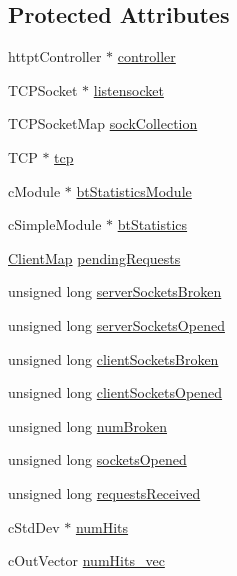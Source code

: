 \subsection*{Protected Attributes}
\begin{DoxyCompactItemize}
\item 
httpt\+Controller $\ast$ \hyperlink{classBTCache_ac46f1f65119dfee3d87c5363101aa58b}{controller}
\item 
T\+C\+P\+Socket $\ast$ \hyperlink{classBTCache_ae3203717845093fb0a6e779f9d3d0b52}{listensocket}
\item 
T\+C\+P\+Socket\+Map \hyperlink{classBTCache_a43a311974146b2ef6bc69f6859d24e8e}{sock\+Collection}
\item 
T\+C\+P $\ast$ \hyperlink{classBTCache_ae867f4ad74074c00b641e390d3a9e372}{tcp}
\item 
c\+Module $\ast$ \hyperlink{classBTCache_a404b5d16a842340af5de6fab08181da9}{bt\+Statistics\+Module}
\item 
c\+Simple\+Module $\ast$ \hyperlink{classBTCache_a8299e74f2c743652ed3301c011656928}{bt\+Statistics}
\item 
\hyperlink{classBTCache_ac80b2a8f5787af11c89dbd05a187029e}{Client\+Map} \hyperlink{classBTCache_a27d62db096c4d09c449ecb10d8d19abf}{pending\+Requests}
\item 
unsigned long \hyperlink{classBTCache_a8f2f146c44949bcf78646c043caaae40}{server\+Sockets\+Broken}
\item 
unsigned long \hyperlink{classBTCache_a2b79808f6ff3b27684cebbb78d8801a6}{server\+Sockets\+Opened}
\item 
unsigned long \hyperlink{classBTCache_a59899107c3f728fe1f5703ad116b092c}{client\+Sockets\+Broken}
\item 
unsigned long \hyperlink{classBTCache_af68542d10296c40d603c98ee977a46d6}{client\+Sockets\+Opened}
\item 
unsigned long \hyperlink{classBTCache_ad1d45c4a6c3eb41f97723c052831c63f}{num\+Broken}
\item 
unsigned long \hyperlink{classBTCache_ada2e7c16bb0919521475b4fd6014cd80}{sockets\+Opened}
\item 
unsigned long \hyperlink{classBTCache_a14de443ddf388fb6b61381b5a881e099}{requests\+Received}
\item 
c\+Std\+Dev $\ast$ \hyperlink{classBTCache_a7432b26e77f5a8e3d5b910b5cbc179b3}{num\+Hits}
\item 
c\+Out\+Vector \hyperlink{classBTCache_a0ac804101085c06566877a36baa591e7}{num\+Hits\+\_\+vec}
\item 

\end{DoxyCompactItemize}
